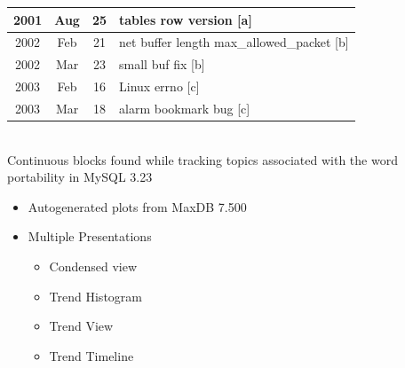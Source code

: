 \documentclass[titlepage,usenames,a4,landscape,semhelv]{seminar}
\begin{document}
\begin{slide}
\begin{itemize}
\begin{itemize}
\begin{specquotef}
\begin{tabular}{|ccc|l|}
2001 &	Aug &	25 &		tables row version [a] \\
\hline
\hline
2002 &	Feb &	21 &		net buffer length	max\_allowed\_packet [b] \\
2002 &	Mar &	23 &		small buf fix [b]	\\
\hline
\hline
2003 &	Feb &	16 &		Linux errno	[c] \\
2003 &	Mar &	18 &		alarm bookmark bug [c] \\
\hline
\end{tabular} \\
{Continuous blocks found while tracking topics associated with the word portability in MySQL 3.23}
\label{tab:portability}
\end{specquotef}








\end{itemize}
\end{itemize}
\begin{itemize}
\item Autogenerated plots from MaxDB 7.500
\item Multiple Presentations
	\begin{itemize}
	\item Condensed view
	\item Trend Histogram 
	\item Trend View
	\item Trend Timeline



\end{itemize}
\end{itemize}
\end{slide}
\end{document}
